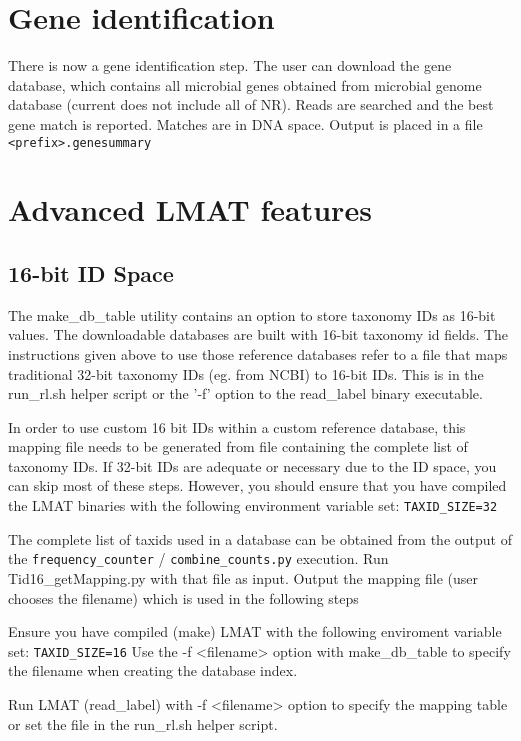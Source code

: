 \documentclass[11pt]{article}
\begin{document}
\section{Gene identification}

There is now a gene identification step.  The user can download the gene database, which contains all microbial genes obtained from microbial genome database (current does not include all of NR). Reads are searched and the best gene match is reported.  Matches are in DNA space. Output is placed in a file \texttt{<prefix>.genesummary}

\section{Advanced LMAT features}

\subsection{16-bit ID Space}

The make\_db\_table utility contains an option to store taxonomy IDs as 16-bit values.  The downloadable databases are built with 16-bit taxonomy id fields.  The instructions given above to use those reference databases refer to a file that maps traditional 32-bit taxonomy IDs (eg. from NCBI) to 16-bit IDs.  This is in the run\_rl.sh helper script or the '-f' option to the read\_label binary executable.

In order to use custom 16 bit IDs within a custom reference database, this mapping file  needs to be generated from file containing the complete list of taxonomy IDs.  If 32-bit IDs are adequate or necessary due to the ID space, you can skip most of these steps.  However, you should ensure that you have compiled the LMAT binaries with the following environment variable set:  \texttt{TAXID\_SIZE=32}  

  The complete list of taxids used in a database can be obtained from the output of the \texttt{frequency\_counter} / \texttt{combine\_counts.py} execution.  Run Tid16_getMapping.py with that file as input.  Output the mapping file (user chooses the filename) which is used in the following steps

Ensure you have compiled (make) LMAT with the following enviroment variable set:  \texttt{TAXID\_SIZE=16}
Use the -f <filename> option with make\_db\_table to specify the filename when creating the database index.

Run LMAT (read\_label) with -f <filename> option to specify the mapping table or set the file in the run\_rl.sh helper script.
\end{document}
